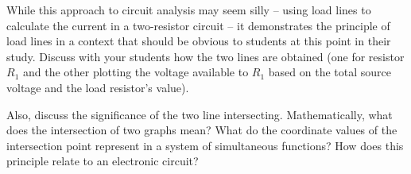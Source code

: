 





While this approach to circuit analysis may seem silly -- using load lines to calculate the current in a two-resistor circuit -- it demonstrates the principle of load lines in a context that should be obvious to students at this point in their study.  Discuss with your students how the two lines are obtained (one for resistor $R_1$ and the other plotting the voltage available to $R_1$ based on the total source voltage and the load resistor's value).  

Also, discuss the significance of the two line intersecting.  Mathematically, what does the intersection of two graphs mean?  What do the coordinate values of the intersection point represent in a system of simultaneous functions?  How does this principle relate to an electronic circuit?




